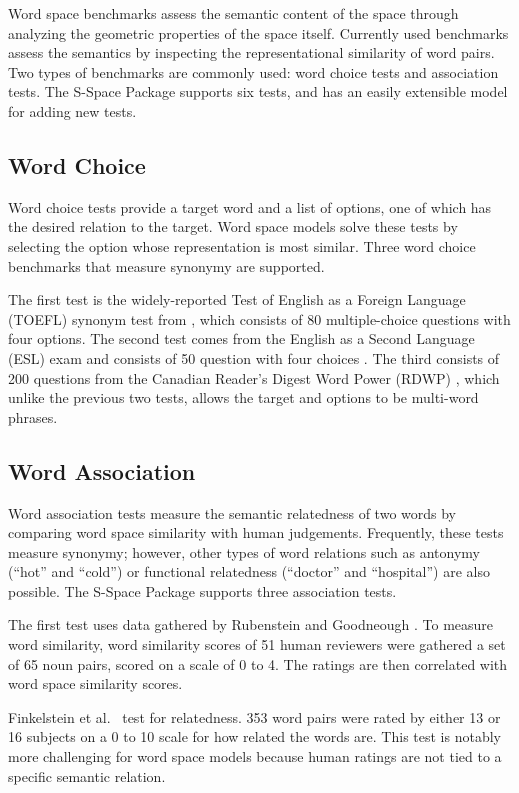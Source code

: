 Word space benchmarks assess the semantic content of the space through analyzing
the geometric properties of the space itself.  Currently used benchmarks assess
the semantics by inspecting the representational similarity of word pairs.  Two
types of benchmarks are commonly used: word choice tests and association tests.
%
The S-Space Package supports six tests, and has an easily extensible model for
adding new tests.

\subsection{Word Choice}

Word choice tests provide a target word and a list of options, one of which has
the desired relation to the target.  Word space models solve these tests by
selecting the option whose representation is most similar.  Three word choice
benchmarks that measure synonymy are supported.

The first test is the widely-reported Test of English as a Foreign Language
(TOEFL) synonym test from \cite{landauer98introduction}, which consists of 80
multiple-choice questions with four options.  The second test comes from the
English as a Second Language (ESL) exam and consists of 50 question with four
choices \cite{turney01mining}.  The third consists of 200 questions from the
Canadian Reader's Digest Word Power (RDWP) \cite{jarmasz03rogets}, which unlike
the previous two tests, allows the target and options to be multi-word phrases.

\subsection{Word Association}

Word association tests measure the semantic relatedness of two words by
comparing word space similarity with human judgements.  Frequently, these tests
measure synonymy; however, other types of word relations such as antonymy
(``hot'' and ``cold'') or functional relatedness (``doctor'' and ``hospital'')
are also possible.  The S-Space Package supports three association tests.

The first test uses data gathered by Rubenstein and Goodneough
.  To measure word similarity, word similarity
scores of 51 human reviewers were gathered a set of 65 noun pairs, scored on a
scale of 0 to 4.  The ratings are then correlated with word space similarity
scores.

Finkelstein et al.\  test for relatedness.  353
word pairs were rated by either 13 or 16 subjects on a 0 to 10 scale for how
related the words are.  This test is notably more challenging for word space
models because human ratings are not tied to a specific semantic relation.

